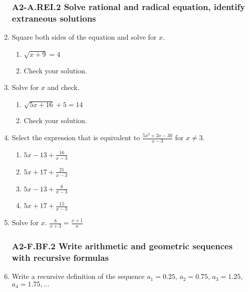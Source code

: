 \documentclass[12pt, twoside]{article}
\begin{document}
\begin{enumerate}[itemsep=0.5cm]
\subsubsection*{A2-A.REI.2 Solve rational and radical equation, identify extraneous solutions}
\item Square both sides of the equation and solve for $x$.
    \begin{multicols}{2}
    \begin{enumerate}[itemsep=0.5cm]
        \item  $\sqrt{x + 9}=4$
        \item Check your solution.
    \end{enumerate}
    \end{multicols} \vspace{3cm}

\item Solve for $x$ and check.
    \begin{multicols}{2}
    \begin{enumerate}[itemsep=0.5cm]
        \item  $\sqrt{5x+16} + 5 = 14$
        \item Check your solution.
    \end{enumerate}
    \end{multicols} \vspace{3cm}

\newpage
\item Select the expression that is equivalent to $\displaystyle \frac{5x^2 + 2x - 30}{x - 3}$ for $x \neq 3$.
    \begin{enumerate}
        \item $\displaystyle 5x - 13 + \frac{16}{x - 3}$
        \item $\displaystyle 5x + 17 + \frac{21}{x - 3}$
        \item $\displaystyle 5x - 13 + \frac{8}{x - 3}$
        \item $\displaystyle 5x + 17 + \frac{15}{x - 3}$
    \end{enumerate}
    \vspace{2cm}

\item Solve for $x$. $\displaystyle \frac{8}{x+3} = \frac{x+1}{x}$ \vspace{5cm}


\subsubsection*{A2-F.BF.2 Write arithmetic and geometric sequences with recursive formulas}
\item Write a recursive definition of the sequence $a_1 = 0.25$, $a_2 = 0.75$, $a_3 = 1.25$, $a_4 = 1.75, \ldots$ \vspace{1cm}


\end{enumerate}
\end{document}
